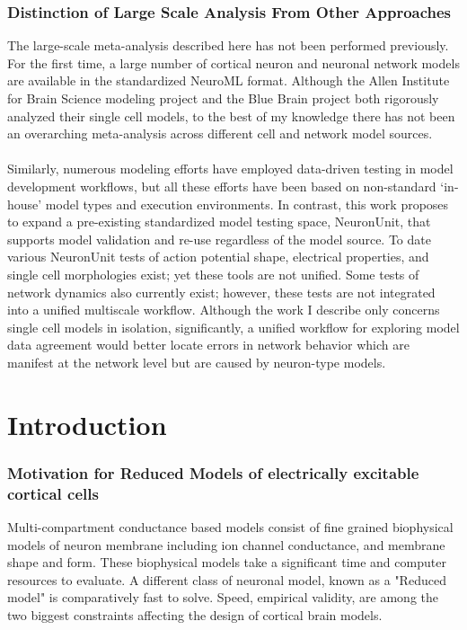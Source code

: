 \subsection{Distinction of Large Scale Analysis From Other Approaches}
The large-scale meta-analysis described here has not been performed previously. For the first time, a large number of cortical neuron and neuronal network models are available in the standardized NeuroML format. Although the Allen Institute for Brain Science modeling project and the Blue Brain project both rigorously analyzed their single cell models, to the best of my knowledge there has not been an overarching meta-analysis across different cell and network model sources.\\
\\
Similarly, numerous modeling efforts have employed data-driven testing in model development workflows, but all these efforts have been based on non-standard ‘in-house’ model types and execution environments. In contrast, this work proposes to expand a pre-existing standardized model testing space, NeuronUnit, that supports model validation and re-use regardless of the model source. To date various NeuronUnit tests of action potential shape, electrical properties, and single cell morphologies exist; yet these tools are not unified. Some tests of network dynamics also currently exist; however, these tests are not integrated into a unified multiscale workflow. Although the work I describe only concerns single cell models in isolation, significantly, a unified workflow for exploring model data agreement would better locate errors in network behavior which are manifest at the network level but are caused by neuron-type models. \newline
\newline

\chapter{Introduction}

\subsection*{Motivation for Reduced Models of electrically excitable cortical cells}

Multi-compartment conductance based models consist of fine grained biophysical models of neuron membrane including ion channel conductance, and membrane shape and form. These biophysical models take a significant time and computer resources to evaluate. A different class of neuronal model, known as a "Reduced model" is comparatively fast to solve. Speed, empirical validity, are among the two biggest constraints affecting the design of cortical brain models. 

